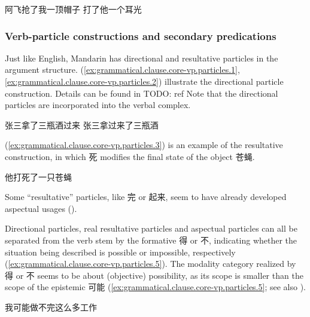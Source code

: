 \documentclass[UTF8, a4paper, oneside, scheme=plain, 12pt]{ctexrep}
\begin{document}
\begin{exe}
    \ex\label{ex:grammatical.clause.core-vp.valency.do-affect-patient.1} 阿飞抢了我一顶帽子
    \ex\label{ex:grammatical.clause.core-vp.valency.do-affect-patient.2} 打了他一个耳光
\end{exe}

\subsubsection{Verb-particle constructions and secondary predications}\label{sec:grammatical.clause.core-vp.particles}

Just like English, Mandarin has directional and resultative particles in the argument structure.
(\ref{ex:grammatical.clause.core-vp.particles.1}, \ref{ex:grammatical.clause.core-vp.particles.2})
illustrate the directional particle construction.
Details can be found in TODO: ref
Note that the directional particles are incorporated into the verbal complex.

\begin{exe}
    \ex\label{ex:grammatical.clause.core-vp.particles.1} 张三拿了三瓶酒过来
    \ex\label{ex:grammatical.clause.core-vp.particles.2} 张三拿过来了三瓶酒
\end{exe}

(\ref{ex:grammatical.clause.core-vp.particles.3}) is an example
of the resultative construction,
in which 死 modifies the final state of the object 苍蝇.

\begin{exe}
    \ex\label{ex:grammatical.clause.core-vp.particles.3} 他打死了一只苍蝇
\end{exe}

Some ``resultative'' particles, like 完 or 起来, seem to have already developed aspectual usages
().

Directional particles, real resultative particles and aspectual particles 
can all be separated from the verb stem by the formative 得 or 不,
indicating whether the situation being described is possible or impossible, respectively
(\ref{ex:grammatical.clause.core-vp.particles.5}).
The modality category realized by 得 or 不 seems to be about (objective) possibility,
as its scope is smaller than the scope of the epistemic 可能
(\ref{ex:grammatical.clause.core-vp.particles.5}; see also ).

\begin{exe}
    \ex\label{ex:grammatical.clause.core-vp.particles.5} 我可能做不完这么多工作
\end{exe}
\end{document}

